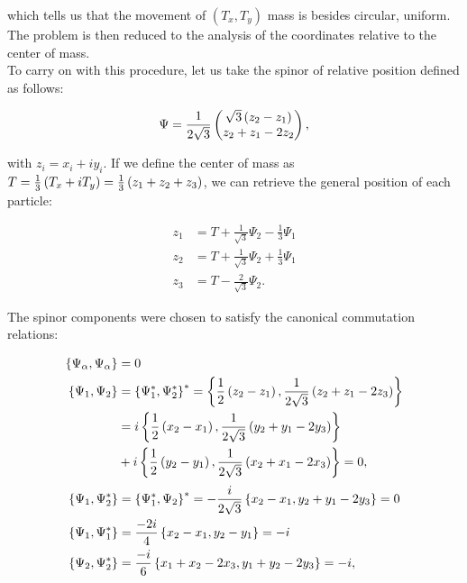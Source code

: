 which tells us that the movement of $(T_x,T_y)$ mass is besides circular, uniform. The problem is then reduced to the analysis of the coordinates relative to the center of mass.\\

To carry on with this procedure, let us take the spinor of relative position defined as follows:

\begin{align}
\Psi = \frac{1}{2\sqrt{3}}\begin{pmatrix}\sqrt{3}\left( z_{2}-z_{1} \right)\\
z_{2}+z_{1}-2z_{2}\end{pmatrix},
\label{eq:spinor}
\end{align}

with $z_{i} = x_i + iy_i$. If we define the center of mass as $T = \frac{1}{3}\left( T_x + iT_y \right) = \frac{1}{3}\left( z_1 +z_2+z_3 \right)$, we can retrieve the general position of each particle:

\small
\begin{equation}
\begin{aligned}
z_1 &= T+\frac{1}{\sqrt{3}}\Psi_2 - \frac{1}{3}\Psi_1 \\
z_2 &= T+\frac{1}{\sqrt{3}}\Psi_2 + \frac{1}{3}\Psi_1 \\
z_3 &= T-\frac{2}{\sqrt{3}}\Psi_2.
\end{aligned}
\label{eq:singlevecs}
\end{equation}
\normalsize

The spinor components were chosen to satisfy the canonical commutation relations:

\begin{align*}
\left\lbrace \Psi_\alpha, \Psi_\alpha \right\rbrace &= 0\\
\left\lbrace \Psi_1, \Psi_2 \right\rbrace &= \left\lbrace \Psi_1^*, \Psi_2^* \right\rbrace^* = \left\lbrace \frac{1}{2}\left( z_{2}-z_{1} \right), \frac{1}{2\sqrt{3}}\left( z_{2}+z_{1}-2z_{3} \right) \right\rbrace \\
&= i\left\lbrace \frac{1}{2}\left( x_{2}-x_{1} \right), \frac{1}{2\sqrt{3}}\left( y_{2}+y_{1}-2y_{3} \right) \right\rbrace\\
&+ i\left\lbrace \frac{1}{2}\left( y_{2}-y_{1} \right), \frac{1}{2\sqrt{3}}\left( x_{2}+x_{1}-2x_{3} \right) \right\rbrace = 0,
\end{align*}
\small
\begin{align*}
\left\lbrace \Psi_1, \Psi_2^* \right\rbrace &= \left\lbrace \Psi_1^*, \Psi_2 \right\rbrace^* = -\frac{i}{2\sqrt{3}}\left\lbrace x_{2}-x_{1}, y_{2}+y_{1}-2y_{3} \right\rbrace = 0\\
\left\lbrace \Psi_1, \Psi_1^* \right\rbrace &= \frac{-2i}{4}\left\lbrace x_{2}-x_{1}, y_2-y_1 \right\rbrace = -i\\
\left\lbrace \Psi_2, \Psi_2^* \right\rbrace &= \frac{-i}{6}\left\lbrace x_{1}+x_{2}-2x_3, y_1+y_2-2y_3 \right\rbrace = -i,
\end{align*}
\normalsize

